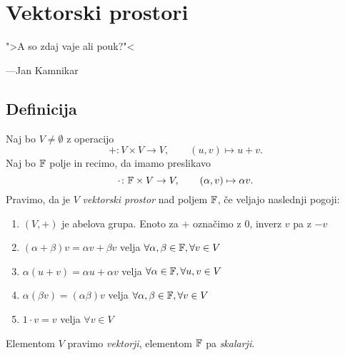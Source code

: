 \documentclass[12pt, a4paper]{article}
\begin{document}
\newpage

\section{Vektorski prostori}

\epigraph{">A so zdaj vaje ali pouk?"<}{---Jan Kamnikar}

\subsection{Definicija}

\begin{okvir}
\begin{definicija}
Naj bo $V\ne\emptyset$ z operacijo
\[
+\colon V\times V\to V,\qquad (u,v)\mapsto u+v.
\]
Naj bo $\mathbb{F}$ polje in recimo, da imamo preslikavo
\[
\cdot\colon \mathbb{F}\times V\to V,\qquad(\alpha,v)\mapsto\alpha v.
\]
Pravimo, da je $V$ \emph{vektorski prostor} nad poljem $\mathbb{F}$, če veljajo naslednji pogoji:

\begin{enumerate}[label=\roman*)]
\item $(V,+)$ je abelova grupa. Enoto za $+$ označimo z $0$, inverz $v$ pa z $-v$
\item $(\alpha+\beta)v=\alpha v+\beta v$ velja $\forall\alpha,\beta\in \mathbb{F},\forall v\in V$
\item $\alpha(u+v)=\alpha u+\alpha v$ velja $\forall\alpha\in \mathbb{F},\forall u,v\in V$
\item $\alpha(\beta v)=(\alpha\beta)v$ velja $\forall\alpha,\beta\in \mathbb{F},\forall v\in V$
\item $1\cdot v=v$ velja $\forall v\in V$
\end{enumerate}
Elementom $V$ pravimo \emph{vektorji}, elementom $\mathbb{F}$ pa \emph{skalarji}.
\end{definicija}
\end{okvir}
\end{document}
